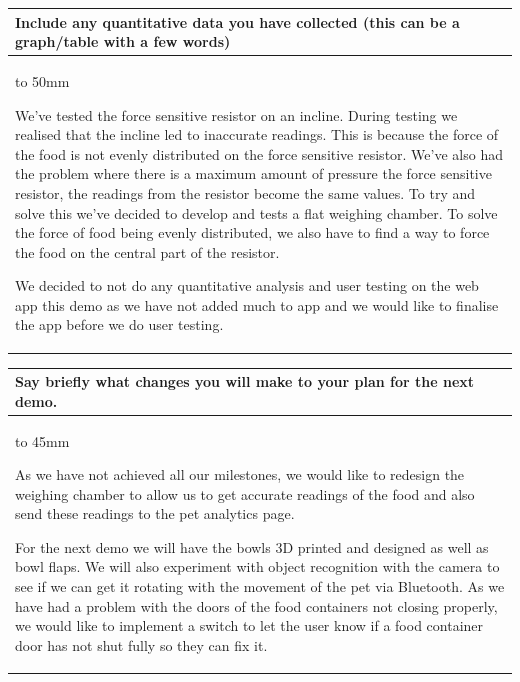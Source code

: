 \documentclass[a4paper]{article}
\newcommand{\colWidth}{141mm}
\begin{document}
\begin{center}

\begin{tabular}{|p{\colWidth}|}
	\hline
	\cellcolor{blue!25}\large
	\textbf{Include any quantitative data you have collected (this can be a graph/table with a few words)}
	\\ \hline
	\vtop to 50mm{
	We've tested the force sensitive resistor on an incline. During testing we realised that the incline led to inaccurate readings. This is because the force of the food is not evenly distributed on the force sensitive resistor. We’ve also had the problem where there is a maximum amount of pressure the force sensitive resistor, the readings from the resistor become the same values. To try and solve this we've decided to develop and tests a flat weighing chamber. To solve the force of food being evenly distributed, we also have to find a way to force the food on the central part of the resistor.
	
	\vspace{5mm}
We decided to not do any quantitative analysis and user testing on the web app this demo as we have not added much to app and we would like to finalise the app before we do user testing.


  }
  \\
  \hline
\end{tabular}
\vskip 5mm

\begin{tabular}{|p{\colWidth}|}
	\hline
	\cellcolor{blue!25}\large
	\textbf{Say briefly what changes you will make to your plan for the next demo.}
	\\ \hline
	\vtop to 45mm{
As we have not achieved all our milestones, we would like to redesign the weighing chamber to allow us to get accurate readings of the food and also send these readings to the pet analytics page.

\vspace{5mm}

For the next demo we will have the bowls 3D printed and designed as well as bowl flaps. We will also experiment with object recognition with the camera to see if we can get it rotating with the movement of the pet via Bluetooth. As we have had a problem with the doors of the food containers not closing properly, we would like to implement a switch to let the user know if a food container door has not shut fully so they can fix it.

}
  \\
  \hline
  
\end{tabular}

\end{center}
  
\end{document}
